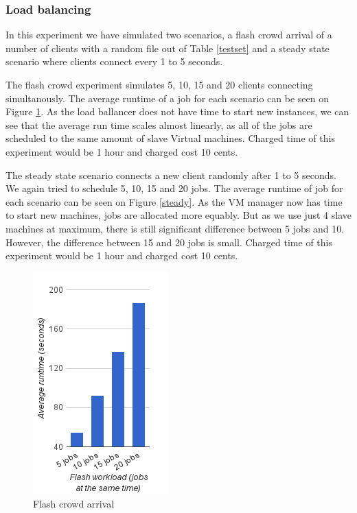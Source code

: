 
\subsubsection{Load balancing}
In this experiment we have simulated two scenarios, a flash crowd arrival of a number of clients with a random file out of Table \ref{testset} and a steady state scenario where clients connect every 1 to 5 seconds. 

The flash crowd experiment simulates 5, 10, 15 and 20 clients connecting simultanously. The average runtime of a job for each scenario can be seen on Figure \ref{flash}. As the load ballancer does not have time to start new instances, we can see that the average run time scales almost linearly, as all of the jobs are scheduled to the same amount of slave Virtual machines. Charged time of this experiment would be 1 hour and charged cost 10 cents.

The steady state scenario connects a new client randomly after 1 to 5 seconds. We again tried to schedule 5, 10, 15 and 20 jobs. The average runtime of job for each scenario can be seen on Figure \ref{steady}. As the VM manager now has time to start new machines, jobs are allocated more equably. But as we use just 4 slave machines at maximum, there is still significant difference between 5 jobs and 10. However, the difference between 15 and 20 jobs is small. Charged time of this experiment would be 1 hour and charged cost 10 cents.

\begin{figure}
 \centering

 \includegraphics{flash-graph}
 \caption{Flash crowd arrival}
 \label{flash}
 \end{figure}

